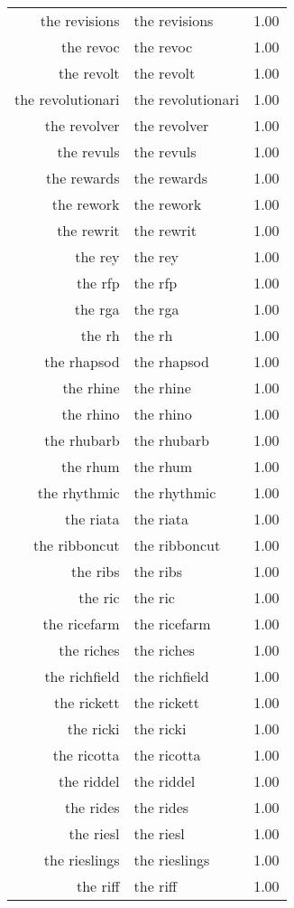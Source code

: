 \begin{table}[ht]
\begin{tabular}{rlr}
  the revisions & the revisions & 1.00 \\ 
  the revoc & the revoc & 1.00 \\ 
  the revolt & the revolt & 1.00 \\ 
  the revolutionari & the revolutionari & 1.00 \\ 
  the revolver & the revolver & 1.00 \\ 
  the revuls & the revuls & 1.00 \\ 
  the rewards & the rewards & 1.00 \\ 
  the rework & the rework & 1.00 \\ 
  the rewrit & the rewrit & 1.00 \\ 
  the rey & the rey & 1.00 \\ 
  the rfp & the rfp & 1.00 \\ 
  the rga & the rga & 1.00 \\ 
  the rh & the rh & 1.00 \\ 
  the rhapsod & the rhapsod & 1.00 \\ 
  the rhine & the rhine & 1.00 \\ 
  the rhino & the rhino & 1.00 \\ 
  the rhubarb & the rhubarb & 1.00 \\ 
  the rhum & the rhum & 1.00 \\ 
  the rhythmic & the rhythmic & 1.00 \\ 
  the riata & the riata & 1.00 \\ 
  the ribboncut & the ribboncut & 1.00 \\ 
  the ribs & the ribs & 1.00 \\ 
  the ric & the ric & 1.00 \\ 
  the ricefarm & the ricefarm & 1.00 \\ 
  the riches & the riches & 1.00 \\ 
  the richfield & the richfield & 1.00 \\ 
  the rickett & the rickett & 1.00 \\ 
  the ricki & the ricki & 1.00 \\ 
  the ricotta & the ricotta & 1.00 \\ 
  the riddel & the riddel & 1.00 \\ 
  the rides & the rides & 1.00 \\ 
  the riesl & the riesl & 1.00 \\ 
  the rieslings & the rieslings & 1.00 \\ 
  the riff & the riff & 1.00 \\ 

\end{tabular}
\end{table}

